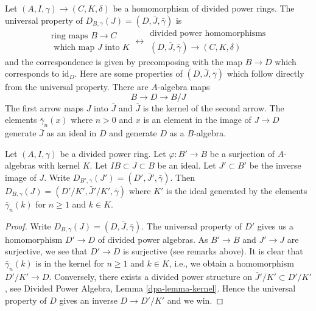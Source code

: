 \noindent
Let $(A, I, \gamma) \to (C, K, \delta)$ be a homomorphism of divided
power rings. The universal property of
$D_{B, \gamma}(J) = (D, \bar J, \bar \gamma)$ is
$$
\begin{matrix}
\text{ring maps }B \to C \\
\text{ which map }J\text{ into }K
\end{matrix}
\longleftrightarrow
\begin{matrix}
\text{divided power homomorphisms} \\
(D, \bar J, \bar \gamma) \to (C, K, \delta)
\end{matrix}
$$
and the correspondence is given by precomposing with the map $B \to D$
which corresponds to $\text{id}_D$. Here are some properties of
$(D, \bar J, \bar \gamma)$ which follow directly from the universal
property. There are $A$-algebra maps
\begin{equation}
\label{equation-divided-power-envelope}
B \longrightarrow D \longrightarrow B/J
\end{equation}
The first arrow maps $J$ into $\bar J$ and $\bar J$ is the kernel
of the second arrow. The elements $\bar\gamma_n(x)$ where $n > 0$
and $x$ is an element in the image of $J \to D$ generate $\bar J$
as an ideal in $D$ and generate $D$ as a $B$-algebra.

\begin{lemma}
\label{lemma-divided-power-envelop-quotient}
Let $(A, I, \gamma)$ be a divided power ring.
Let $\varphi : B' \to B$ be a surjection of $A$-algebras with kernel $K$.
Let $IB \subset J \subset B$ be an ideal. Let $J' \subset B'$
be the inverse image of $J$. Write
$D_{B', \gamma}(J') = (D', \bar J', \bar\gamma)$.
Then $D_{B, \gamma}(J) = (D'/K', \bar J'/K', \bar\gamma)$
where $K'$ is the ideal generated by the elements $\bar\gamma_n(k)$
for $n \geq 1$ and $k \in K$.
\end{lemma}

\begin{proof}
Write $D_{B, \gamma}(J) = (D, \bar J, \bar \gamma)$.
The universal property of $D'$ gives us a homomorphism $D' \to D$
of divided power algebras. As $B' \to B$ and $J' \to J$ are surjective, we
see that $D' \to D$ is surjective (see remarks above). It is clear that
$\bar\gamma_n(k)$ is in the kernel for $n \geq 1$ and $k \in K$, i.e.,
we obtain a homomorphism $D'/K' \to D$. Conversely, there exists a divided
power structure on $\bar J'/K' \subset D'/K'$, see
Divided Power Algebra, Lemma \ref{dpa-lemma-kernel}.
Hence the universal property of $D$ gives an inverse $D \to D'/K'$ and we win.
\end{proof}

